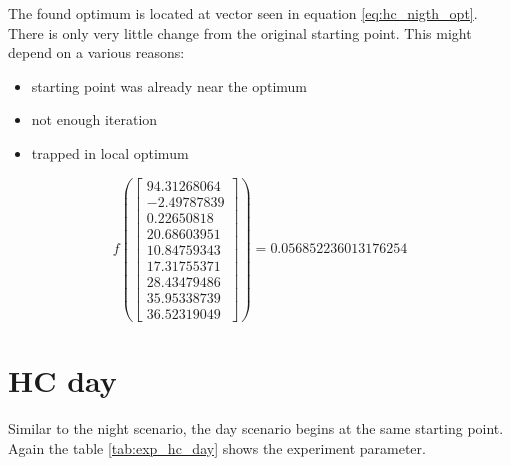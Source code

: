 \documentclass[./\jobname.tex]{subfiles}
\begin{document}
The found optimum is located at vector seen in equation \ref{eq:hc_nigth_opt}. 
There is only very little change from the original starting point. This might depend on a various reasons: 

\begin{itemize}
	\item starting point was already near the optimum
	\item not enough iteration
	\item trapped in local optimum
\end{itemize}

\begin{equation}
f \left( \begin{bmatrix}
94.31268064 \\ -2.49787839 \\ 0.22650818 \\ 20.68603951 \\ 10.84759343 \\ 17.31755371 \\ 28.43479486 \\ 35.95338739 \\ 36.52319049
\end{bmatrix} \right) 
= 0.056852236013176254
\label{eq:hc_nigth_opt}
\end{equation}


\section{HC day}

Similar to the night scenario, the day scenario begins at the same starting point. Again the table \ref{tab:exp_hc_day} shows the experiment parameter. 

\begin{table}[H]
	\centering
	\noindent{}
	\label{tab:exp_hc_day}
\end{table}
\end{document}
